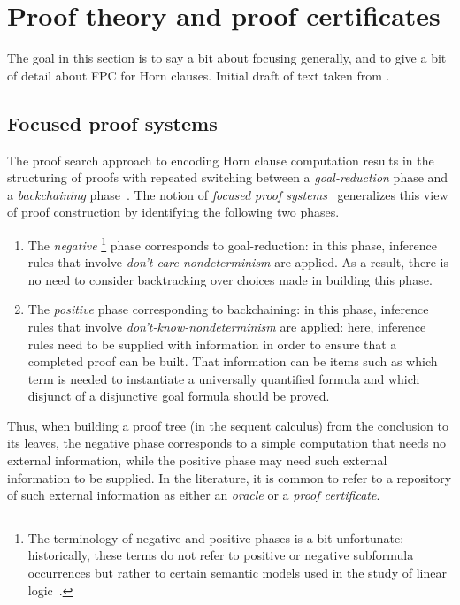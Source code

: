 \section{Proof theory and proof certificates}

{\color{red} The goal in this section is to say a bit about focusing
  generally, and to give a bit of detail about FPC for Horn clauses.
  Initial draft of text taken from \cite{blanco19ppdp}.
}

\subsection{Focused proof systems}
\label{ssec:focused}

The proof search approach to encoding Horn clause computation
results in the structuring of proofs with repeated
switching between a \emph{goal-reduction} phase and a
\emph{backchaining} phase~\cite{miller91apal}.
%
The notion of \emph{focused proof systems}~\cite{andreoli92jlc,liang09tcs}
generalizes this view of proof construction by identifying the
following two phases. %
\begin{enumerate}
\item The \emph{negative}%
\footnote{The terminology of negative and positive phases is a bit
  unfortunate: historically, these terms do not refer to positive or negative
  subformula occurrences but rather to certain semantic models used in
  the study of linear logic~\cite{girard87tcs}.}
%
  phase corresponds to  goal-reduction: in this phase,
  inference rules that involve \emph{don't-care-non\-de\-ter\-min\-ism} are
  applied.
%
  As a result, there is no need to consider backtracking over choices
  made in building this phase.

\item The \emph{positive} phase corresponding to  backchaining: in this phase, inference rules that involve
  \emph{don't-know-non\-de\-ter\-min\-ism} are applied: here,
  inference rules need to be supplied with information in order to
  ensure that a completed proof can be built.
%
  That information can be items such as which term is needed to
  instantiate a universally quantified formula and which disjunct of a
  disjunctive goal formula should be proved.
\end{enumerate}
%
Thus, when building a proof tree (in the sequent calculus) from the
conclusion to its leaves, the negative phase corresponds to a simple
computation that needs no external information, while the positive
phase may need such external information to be supplied.
%
In the literature, it is common to refer to a repository of such
external information as either an \emph{oracle} or a \emph{proof
certificate}.

